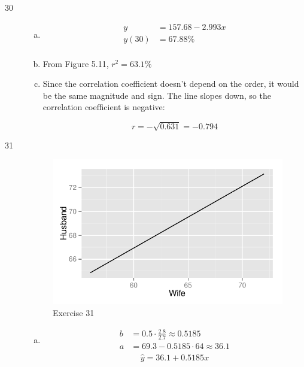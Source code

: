 \documentclass[letterpaper, landscape]{exam}
\begin{document}
\begin{description}
      \item[30]
        \begin{enumerate}[(a)]
          \item 
            \begin{align*}
              y     & = 157.68 - 2.993 x \\
              y(30) & = \boxed{ 67.88 \% } \\
            \end{align*}

          \item From Figure 5.11, $r^2 = \boxed{ 63.1 \% }$
            
          \item 
            Since the correlation coefficient doesn't depend on the order,
            it would be the same magnitude and sign.  The line slopes down, so
            the correlation coefficient is negative:

            \[
              r = - \sqrt{0.631} = \boxed{ - 0.794 }
            \]

        \end{enumerate}

      \item[31]
        \begin{figure}[H]
          \centering
          \includegraphics[scale = 0.9]{figures/ex31.pdf}
          \caption{Exercise 31}\label{fig:31}
        \end{figure}

        \begin{enumerate}[(a)]
          \item
            \begin{align*}
              b  & = 0.5 \cdot \frac{2.8}{2.7} \approx 0.5185 \\
              a  & = 69.3 - 0.5185 \cdot 64 \approx 36.1 \\
            \end{align*}
            \[
              \boxed{ \hat{y} = 36.1 + 0.5185 x }
            \]


\end{enumerate}
\end{description}
\end{document}

